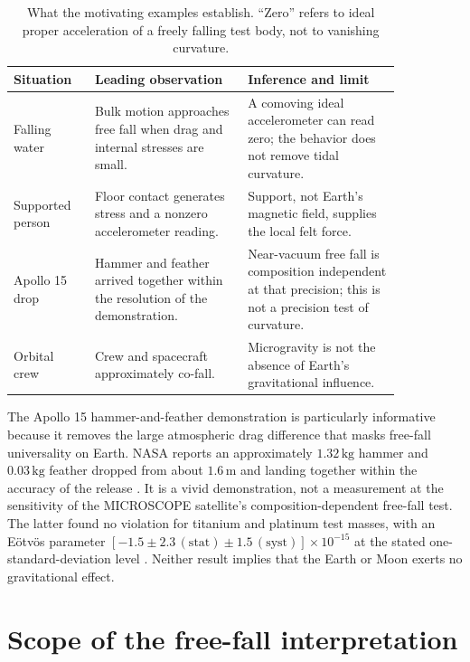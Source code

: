 \documentclass[11pt,letterpaper]{article}
\begin{document}
\begin{table}[t]
\caption{What the motivating examples establish. ``Zero'' refers to ideal proper acceleration of a freely falling test body, not to vanishing curvature.}
\label{tab:examples}
\centering
\renewcommand{\arraystretch}{1.16}
\begin{tabular}{L{0.17\linewidth}L{0.34\linewidth}L{0.34\linewidth}}
\toprule
Situation & Leading observation & Inference and limit \\
\midrule
Falling water & Bulk motion approaches free fall when drag and internal stresses are small. & A comoving ideal accelerometer can read zero; the behavior does not remove tidal curvature. \\
Supported person & Floor contact generates stress and a nonzero accelerometer reading. & Support, not Earth's magnetic field, supplies the local felt force. \\
Apollo 15 drop & Hammer and feather arrived together within the resolution of the demonstration. & Near-vacuum free fall is composition independent at that precision; this is not a precision test of curvature. \\
Orbital crew & Crew and spacecraft approximately co-fall. & Microgravity is not the absence of Earth's gravitational influence. \\
\bottomrule
\end{tabular}
\end{table}

The Apollo 15 hammer-and-feather demonstration is particularly informative because it removes the large atmospheric drag difference that masks free-fall universality on Earth. NASA reports an approximately $1.32\,\mathrm{kg}$ hammer and $0.03\,\mathrm{kg}$ feather dropped from about $1.6\,\mathrm m$ and landing together within the accuracy of the release \cite{NASAApollo}. It is a vivid demonstration, not a measurement at the sensitivity of the MICROSCOPE satellite's composition-dependent free-fall test. The latter found no violation for titanium and platinum test masses, with an E\"otv\"os parameter $[-1.5\pm2.3\,(\mathrm{stat})\pm1.5\,(\mathrm{syst})]\times10^{-15}$ at the stated one-standard-deviation level \cite{Microscope}. Neither result implies that the Earth or Moon exerts no gravitational effect.

\section{Scope of the free-fall interpretation}
\end{document}
